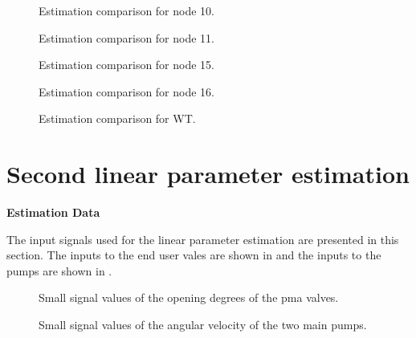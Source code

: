\begin{figure}[H]
  \centering
  \begin{minipage}[b]{0.45\textwidth}
     
    \caption{Estimation comparison for node 10.}
  \end{minipage}
  \hfill
  \begin{minipage}[b]{0.45\textwidth}
     
    \caption{Estimation comparison for node 11.}
  \end{minipage}
\end{figure}

\begin{figure}[H]
  \centering
  \begin{minipage}[b]{0.45\textwidth}
     
    \caption{Estimation comparison for node 15.}
  \end{minipage}
  \hfill
  \begin{minipage}[b]{0.45\textwidth}
     
    \caption{Estimation comparison for node 16.}
  \end{minipage}
\end{figure}

\begin{figure}[H]
 \centering
     
    \caption{Estimation comparison for WT.}
\end{figure}

\section{Second linear parameter estimation}
\label{LinResults_2}
\textbf{Estimation Data}

The input signals used for the linear parameter estimation are presented in this section.  
The inputs to the end user vales are shown in  and the inputs to the pumps are shown in . 


\begin{figure}[H]
  \centering
  \begin{minipage}[b]{0.45\textwidth}
     
    \caption{Small signal values of the opening degrees of the pma valves. }
    \label{fig:est_OD_data}
  \end{minipage}
  \hfill
  \begin{minipage}[b]{0.45\textwidth}
     
    \caption{Small signal values of the angular velocity of the two main pumps.}
    \label{fig:est_deltap_data}
  \end{minipage}
\end{figure}



